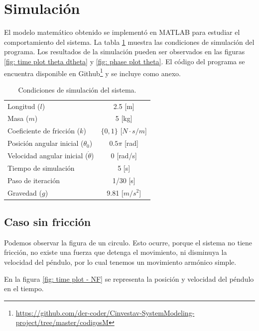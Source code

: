 \section{Simulación}

El modelo matemático obtenido se implementó en MATLAB 
para estudiar el comportamiento del sistema.
La tabla \ref{table: simulation conditions}
muestra las condiciones de simulación del programa.
Los resultados de la simulación pueden ser 
observados en las figuras \ref{fig: time plot theta dtheta}
 y \ref{fig: phase plot theta}. 
El código del programa se encuentra disponible en 
Github\footnote{\url{https://github.com/der-coder/Cinvestav-SystemModeling-project/tree/master/codigosM}}
y se incluye como anexo.

\begin{table}[hb]
 \begin{center}
\begin{tabular}{lc}
\hline
Longitud ($l$) & 2.5 [m] \\
Masa ($m$) & 5 [kg]\\
Coeficiente de fricción ($k$) & $\{0,1\}$ [$N \cdot s / m$] \\
Posición angular inicial ($\theta_0$) & $0.5\pi$ [rad] \\
Velocidad angular inicial ($\dot{\theta}$) & 0 [rad/s] \\
Tiempo de simulación & 5 [s]  \\
Paso de iteración & 1/30 [s] \\
Gravedad ($g$) & 9.81 [$m/s^2$]  \\
\hline
 \end{tabular}
 \end{center}
 \caption{Condiciones de simulación del sistema.}
\label{table: simulation conditions}
\end{table}

\subsection{Caso sin fricción}


Podemos observar la figura de un circulo. 
Esto ocurre, porque el sistema no tiene fricción,
no existe una fuerza que detenga el movimiento, 
ni disminuya la velocidad del péndulo, 
por lo cual tenemos un movimiento armónico simple.

En la figura \ref{fig: time plot - NF} se 
representa la posición y velocidad del péndulo en el tiempo.


